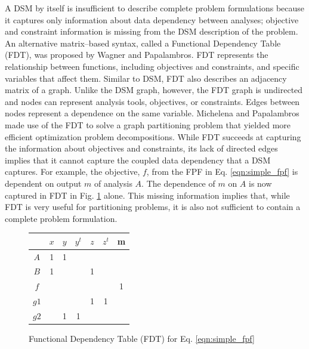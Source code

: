     A DSM by itself is insufficient to describe complete problem formulations because it captures only information about data dependency between analyses; objective and constraint information is missing from the DSM description of the problem. 
    An alternative matrix--based syntax, called a Functional Dependency Table (FDT), was proposed by Wagner and Papalambros. 
    FDT represents the relationship between functions, including objectives and constraints, and specific variables that affect 
    them\cite{Wagner1993}. Similar to DSM, FDT also describes an adjacency matrix of a graph. Unlike the DSM graph, 
    however, the FDT graph is undirected and nodes can represent analysis tools, objectives, 
    or constraints. Edges between nodes represent a dependence on the same 
    variable. Michelena and Papalambros made use of the FDT to solve a graph partitioning problem that yielded 
    more efficient optimization problem decompositions\cite{Michelena1997}. While FDT succeeds at capturing the 
    information about objectives and constraints, its lack of directed edges 
    implies that it cannot capture the coupled data dependency that a DSM captures. For example, 
    the objective, $f$, from the FPF in Eq. \ref{eqn:simple_fpf} is dependent on 
    output $m$ of analysis $A$. The dependence of $m$ on $A$ is now captured 
    in FDT in Fig. \ref{fig:FDT_simple} alone. This missing information implies 
    that, while FDT is very useful for partitioning problems, it is also not 
    sufficient to contain a complete problem formulation. 

    \begin{figure}
        \begin{center}
        \begin{tabular}{|c|c|c|c|c|c|c|}
            \hline
                 & $x$ & $y$ & $y^t$ & $z$ & $z^t$ & m \\ \hline
            $A$  & 1  & 1    &       &     &       &   \\ \hline
            $B$  & 1  &      &       & 1   &       &   \\ \hline
            $f$  &    &      &       &     &       & 1 \\ \hline
            $g1$ &    &      &       & 1   & 1     &   \\ \hline
            $g2$ &    & 1    & 1     &     &       &   \\
            \hline
        \end{tabular}
        \caption{Functional Dependency Table (FDT) for Eq. \ref{eqn:simple_fpf} \label{fig:FDT_simple}}
        \end{center}
    \end{figure}


